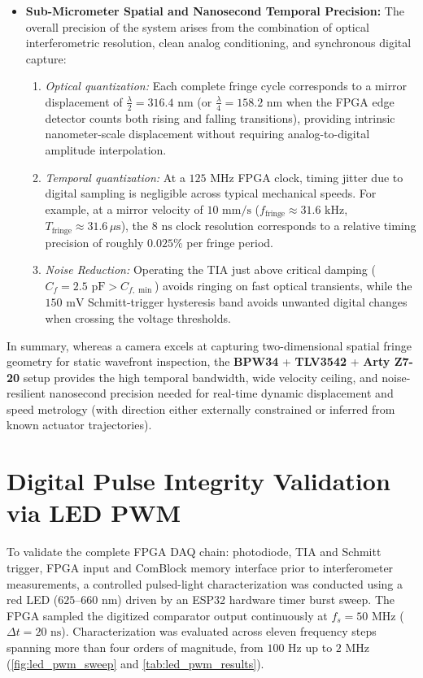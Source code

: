 \begin{itemize}
    \item \textbf{Sub-Micrometer Spatial and Nanosecond Temporal Precision:}
    The overall precision of the system arises from the combination of optical interferometric resolution, clean analog conditioning, and synchronous digital capture:
    \begin{enumerate}
        \item \textit{Optical quantization:} Each complete fringe cycle corresponds to a mirror displacement of $\frac{\lambda}{2} = 316.4\text{ nm}$ (or $\frac{\lambda}{4} = 158.2\text{ nm}$ when the FPGA edge detector counts both rising and falling transitions), providing intrinsic nanometer-scale displacement without requiring analog-to-digital amplitude interpolation.
        \item \textit{Temporal quantization:} At a $125\text{ MHz}$ FPGA clock, timing jitter due to digital sampling is negligible across typical mechanical speeds. For example, at a mirror velocity of $10\text{ mm/s}$ ($f_{\text{fringe}} \approx 31.6\text{ kHz}$, $T_{\text{fringe}} \approx 31.6\,\mu\text{s}$), the $8\text{ ns}$ clock resolution corresponds to a relative timing precision of roughly $0.025\%$ per fringe period.
        \item \textit{Noise Reduction:} Operating the TIA just above critical damping ($C_f = 2.5\text{ pF} > C_{f,\min}$) avoids ringing on fast optical transients, while the $150\text{ mV}$ Schmitt-trigger hysteresis band avoids unwanted digital changes when crossing the voltage thresholds.
    \end{enumerate}
\end{itemize}

In summary, whereas a camera excels at capturing two-dimensional spatial fringe geometry for static wavefront inspection, the \textbf{BPW34} + \textbf{TLV3542} + \textbf{Arty Z7-20} setup provides the high temporal bandwidth, wide velocity ceiling, and noise-resilient nanosecond precision needed for real-time dynamic displacement and speed metrology (with direction either externally constrained or inferred from known actuator trajectories).


\section{Digital Pulse Integrity Validation via LED PWM}
\label{sec:led_pwm_validation}

To validate the complete FPGA DAQ chain:  photodiode, TIA and Schmitt trigger, FPGA input and ComBlock memory interface prior to interferometer measurements, a controlled pulsed-light characterization was conducted using a red LED ($625\text{--}660\text{ nm}$) driven by an ESP32 hardware timer burst sweep. The FPGA sampled the digitized comparator output continuously at $f_s = 50\text{ MHz}$ ($\Delta t = 20\text{ ns}$). Characterization was evaluated across eleven frequency steps spanning more than four orders of magnitude, from $100\text{ Hz}$ up to $2\text{ MHz}$ (\cref{fig:led_pwm_sweep} and \cref{tab:led_pwm_results}).



